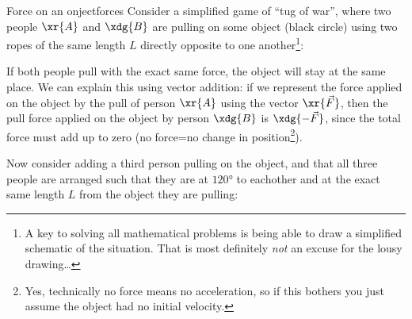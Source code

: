 \begin{example}{Force on an onject}{forces}
  Consider a simplified game of ``tug of war'', where two people $\xr{A}$ and $\xdg{B}$ are pulling on some object (black circle) using two ropes of the same length $L$ directly opposite to one another\footnote{A key to solving all mathematical problems is being able to draw a simplified schematic of the situation. That is most definitely \textit{not} an excuse for the lousy drawing\dots}:

  \vspace{1em}
  \begin{center}
  \end{center}

  If both people pull with the exact same force, the object will stay at the same place. We can explain this using vector addition: if we represent the force applied on the object by the pull of person $\xr{A}$ using the vector $\xr{\vec{F}}$, then the pull force applied on the object by person $\xdg{B}$ is $\xdg{-\vec{F}}$, since the total force must add up to zero (no force=no change in position\footnote{Yes, technically no force means no acceleration, so if this bothers you just assume the object had no initial velocity.}).

  \vspace{1em}
  Now consider adding a third person pulling on the object, and that all three people are arranged such that they are at $\ang{120}$ to eachother and at the exact same length $L$ from the object they are pulling:
  
  \begin{center}
  \end{center}


\end{example}
